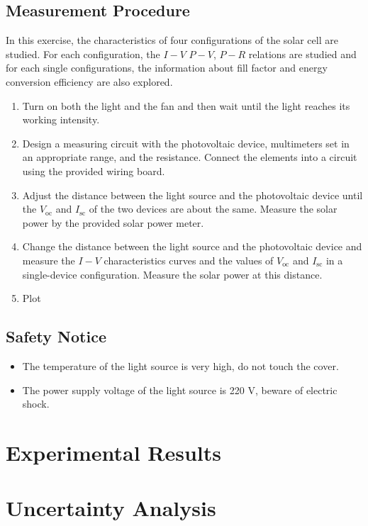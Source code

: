 \documentclass[a4paper]{article}
\begin{document}
\subsection{Measurement Procedure}

In this exercise, the characteristics of four configurations of the solar cell are studied. For each configuration, the $I-V$ $P-V$, $P-R$ relations are studied and for each single configurations, the information about fill factor and energy conversion efficiency are also explored.
\begin{enumerate}
    \item Turn on both the light and the fan and then wait until the light reaches its working intensity.
    \item Design a measuring circuit with the photovoltaic device, multimeters set in an appropriate range, and the resistance. Connect the elements into a circuit using the provided wiring board.
    \item Adjust the distance between the light source and the photovoltaic device until the $V_\text{oc}$ and $I_\text{sc}$ of the two devices are about the same. Measure the solar power by the provided solar power meter.
    \item Change the distance between the light source and the photovoltaic device and measure the $I-V$ characteristics curves and the values of $V_\text{oc}$ and $I_\text{sc}$ in a single-device configuration. Measure the solar power at this distance.
    \item Plot
\end{enumerate}

\subsection{Safety Notice}

\begin{itemize}
	\item The temperature of the light source is very high, do not touch the cover.
	\item The power supply voltage of the light source is 220 V, beware of electric shock.
\end{itemize}


\section{Experimental Results}



\section{Uncertainty Analysis}
\end{document}

